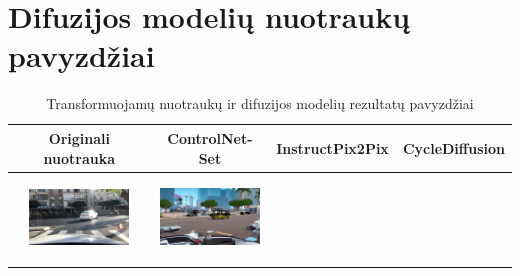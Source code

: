 \documentclass{VUMIFPSbakalaurinis}
\begin{document}
\section{Difuzijos modelių nuotraukų pavyzdžiai}
    \begin{table}[H]
        \footnotesize
        \centering
        \caption{Transformuojamų nuotraukų ir difuzijos modelių rezultatų pavyzdžiai}
        {\begin{tabular}{|c|c|c|c|} \hline
            Originali nuotrauka & ControlNet-Set & InstructPix2Pix  & CycleDiffusion \\
            \hline
            \includegraphics[width=100,height=85]{img/original/7a0ba545-3961a92c} & 
            \includegraphics[width=100,height=85]{img/diffusion/controlnet/7a0ba545-3961a92c} & 

\end{tabular}}
\end{table}
\end{document}
